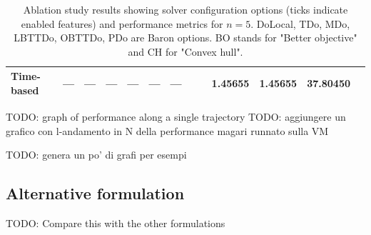 \documentclass[12pt,a4paper]{article}
\numberwithin{equation}{section}
\theoremstyle{mytheorem}
\theoremstyle{myremark}
\theoremstyle{myparagraph}
\newcommand{\yes}{\ding{51}}
\newcommand{\no}{\ding{55}}
\newcommand{\na}{---} %
\begin{document}
\begin{table}[ht]
\begin{threeparttable}
\begin{tabular}{l c c c c c c c c c r r r}
                Time-based           & \na              & \na          & \na          & \na             & \na             & \na          & \yes        & \no         & 1.45655         & 1.45655         & 37.80450          \\
                \bottomrule
            \end{tabular}
            \begin{tablenotes}
                \footnotesize
            \end{tablenotes}
        \end{threeparttable}
        \caption{Ablation study results showing solver configuration options (ticks indicate enabled features) and performance metrics for $n=5$.
        DoLocal, TDo, MDo, LBTTDo, OBTTDo, PDo are Baron options. BO stands for "Better objective" and CH for "Convex hull".}
        \label{tab:ablation_configs}
    \end{table}

    TODO: graph of performance along a single trajectory
    TODO: aggiungere un grafico con l-andamento in N della performance magari runnato sulla VM

    TODO: genera un po' di grafi per esempi

    \subsection{Alternative formulation}

    TODO: Compare this with the other formulations 
    
\end{document}
